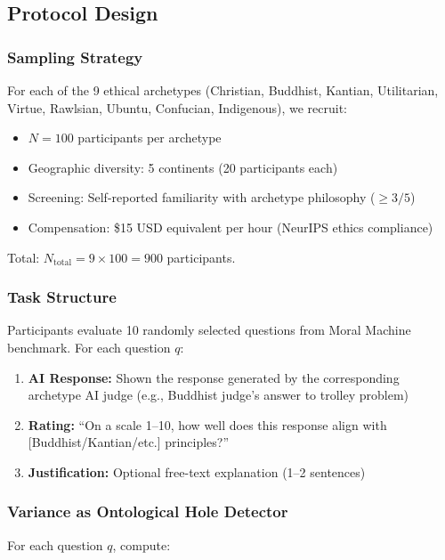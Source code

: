 \documentclass[11pt,a4paper]{article}
\theoremstyle{definition}
\theoremstyle{remark}
\begin{document}
\subsection{Protocol Design}

\subsubsection{Sampling Strategy}

For each of the 9 ethical archetypes (Christian, Buddhist, Kantian, Utilitarian, 
Virtue, Rawlsian, Ubuntu, Confucian, Indigenous), we recruit:

\begin{itemize}
\item $N = 100$ participants per archetype
\item Geographic diversity: 5 continents (20 participants each)
\item Screening: Self-reported familiarity with archetype philosophy ($\geq 3/5$)
\item Compensation: \$15 USD equivalent per hour (NeurIPS ethics compliance)
\end{itemize}

Total: $N_{\text{total}} = 9 \times 100 = 900$ participants.

\subsubsection{Task Structure}

Participants evaluate 10 randomly selected questions from Moral Machine benchmark. 
For each question $q$:

\begin{enumerate}
\item \textbf{AI Response:} Shown the response generated by the corresponding 
archetype AI judge (e.g., Buddhist judge's answer to trolley problem)
\item \textbf{Rating:} ``On a scale 1–10, how well does this response align with 
[Buddhist/Kantian/etc.] principles?''
\item \textbf{Justification:} Optional free-text explanation (1–2 sentences)
\end{enumerate}

\subsubsection{Variance as Ontological Hole Detector}

For each question $q$, compute:
\end{document}
